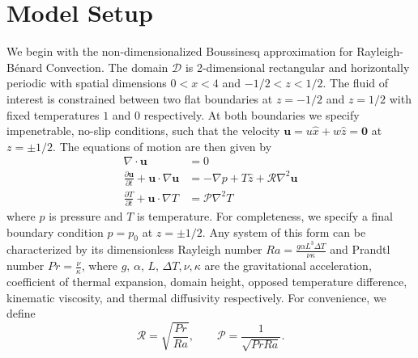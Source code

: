 \documentclass[reprint,amsmath,amssymb,aps]{revtex4-1}
\begin{document}
\section{Model Setup}\label{sec:model}
We begin with the non-dimensionalized Boussinesq approximation for Rayleigh-Bénard Convection. 
The domain $\mathcal{D}$ is 2-dimensional rectangular and horizontally periodic with spatial dimensions $0 < x < 4$ and $-1/2 < z < 1/2$. 
The fluid of interest is constrained between two flat boundaries at $z = -1/2$ and $z = 1/2$ with fixed temperatures $1$ and $0$ respectively. 
At both boundaries we specify impenetrable, no-slip conditions, such that the velocity $\mathbf{u} = u \hat{x} + w \hat{z} = \mathbf{0}$ at $z = \pm 1/2$. 
The equations of motion are then given by
\begin{align}
    \nabla \cdot \mathbf{u} &= 0 \label{EQ:motion1}\\
    \frac{\partial \mathbf{u}}{\partial t} + \mathbf{u} \cdot \nabla \mathbf{u} &= - \nabla p + T \hat{z} + \mathcal{R} \nabla^2 \mathbf{u} \label{EQ:motion2}\\
    \frac{\partial T}{\partial t} + \mathbf{u} \cdot \nabla T &= \mathcal{P} \nabla^2 T \label{EQ:motion3}
\end{align}
where $p$ is pressure and $T$ is temperature. 
For completeness, we specify a final boundary condition $p = p_0$ at $z = \pm 1/2$. 
Any system of this form can be characterized by its dimensionless Rayleigh number $Ra = \frac{g\alpha L^3 \Delta T}{\nu \kappa}$ and Prandtl number $Pr = \frac{\nu}{\kappa}$, where $g, \, \alpha, \, L, \, \Delta T, \nu, \kappa$ are the gravitational acceleration, coefficient of thermal expansion, domain height, opposed temperature difference, kinematic viscosity, and thermal diffusivity respectively. For convenience, we define
\begin{equation}
\mathcal{R} = \sqrt{\frac{Pr}{Ra}}, \qquad \mathcal{P} = \frac{1}{\sqrt{Pr Ra}}.
\end{equation}
\end{document}
